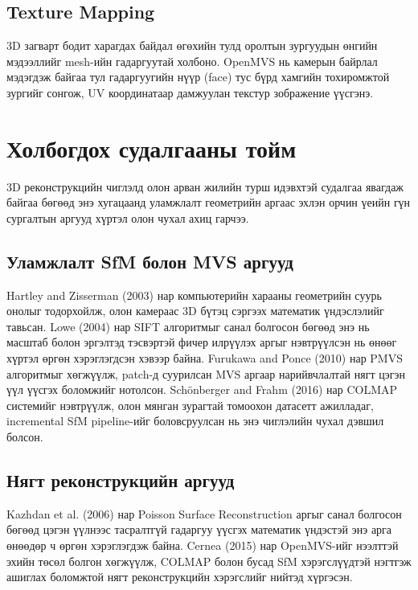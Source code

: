\subsection{Texture Mapping}

3D загварт бодит харагдах байдал өгөхийн тулд оролтын зургуудын өнгийн мэдээллийг mesh-ийн гадаргуутай холбоно. OpenMVS нь камерын байрлал мэдэгдэж байгаа тул гадаргуугийн нүүр (face) тус бүрд хамгийн тохиромжтой зургийг сонгож, UV координатаар дамжуулан текстур зображение үүсгэнэ.

\section{Холбогдох судалгааны тойм}

3D реконструкцийн чиглэлд олон арван жилийн турш идэвхтэй судалгаа явагдаж байгаа
бөгөөд энэ хугацаанд уламжлалт геометрийн аргаас эхлэн орчин үеийн гүн сургалтын
аргууд хүртэл олон чухал ахиц гарчээ.

\subsection{Уламжлалт SfM болон MVS аргууд}

Hartley and Zisserman (2003) нар компьютерийн харааны геометрийн суурь онолыг
тодорхойлж, олон камераас 3D бүтэц сэргээх математик үндэслэлийг тавьсан. Lowe
(2004) нар SIFT алгоритмыг санал болгосон бөгөөд энэ нь масштаб болон эргэлтэд
тэсвэртэй фичер илрүүлэх аргыг нэвтрүүлсэн нь өнөөг хүртэл өргөн хэрэглэгдсэн
хэвээр байна. Furukawa and Ponce (2010) нар PMVS алгоритмыг хөгжүүлж, patch-д
суурилсан MVS аргаар нарийвчлалтай нягт цэгэн үүл үүсгэх боломжийг нотолсон.
Sch{\"o}nberger and Frahm (2016) нар COLMAP системийг нэвтрүүлж, олон мянган зурагтай
томоохон датасетт ажилладаг, incremental SfM pipeline-ийг боловсруулсан нь энэ
чиглэлийн чухал дэвшил болсон.

\subsection{Нягт реконструкцийн аргууд}

Kazhdan et al. (2006) нар Poisson Surface Reconstruction аргыг санал болгосон бөгөөд
цэгэн үүлнээс тасралтгүй гадаргуу үүсгэх математик үндэстэй энэ арга өнөөдөр ч өргөн
хэрэглэгдэж байна. Cernea (2015) нар OpenMVS-ийг нээлттэй эхийн төсөл болгон
хөгжүүлж, COLMAP болон бусад SfM хэрэгслүүдтэй нэгтгэж ашиглах боломжтой нягт
реконструкцийн хэрэгслийг нийтэд хүргэсэн.

